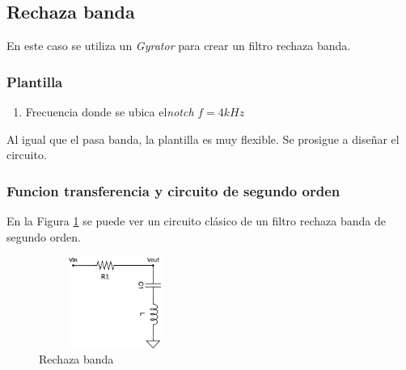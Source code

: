 \documentclass[12pt,a4paper]{article}
\begin{document}



\subsection{Rechaza banda}

En este caso se utiliza un \textit{Gyrator} para crear un filtro rechaza banda. 

\subsubsection{Plantilla}

\begin{enumerate}
\item Frecuencia donde se ubica el\textit{notch} $f = 4kHz$	
\end{enumerate}

Al igual que el pasa banda, la plantilla es muy flexible. Se prosigue a diseñar el circuito. 

\subsubsection{Funcion transferencia y circuito de segundo orden}

En la Figura \ref{ej2_filto_BR} se puede ver un circuito clásico de un filtro rechaza banda de segundo orden. 

\begin{figure}[h!]                                                       
\centering\includegraphics[width=5cm, height=3cm]{Resources/ej2_br.png}
\caption{Rechaza banda}
\label{ej2_filto_BR}
\end{figure}
\end{document}
